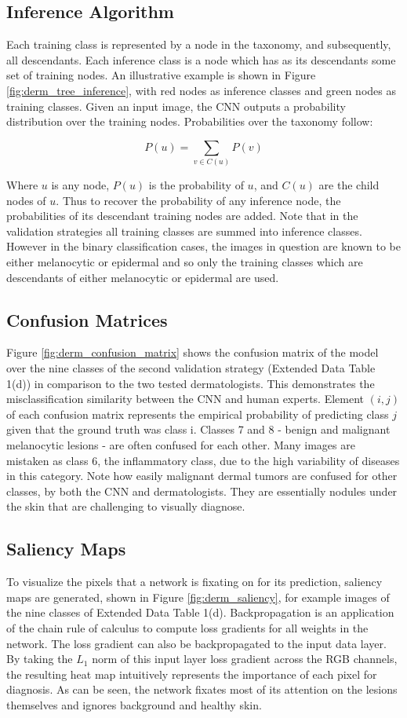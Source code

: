 \subsection{Inference Algorithm}
Each training class is represented by a node in the taxonomy, and subsequently, all descendants. Each inference class is a node which has as its descendants some set of training nodes. An illustrative example is shown in Figure \ref{fig:derm_tree_inference}, with red nodes as inference classes and green nodes as training classes. Given an input image, the CNN outputs a probability distribution over the training nodes. Probabilities over the taxonomy follow:

$$P(u) = \sum_{v \in C(u)}{P(v)}$$

Where $u$ is any node, $P(u)$ is the probability of $u$, and $C(u)$ are the child nodes of $u$. Thus to recover the probability of any inference node, the probabilities of its descendant training nodes are added. Note that in the validation strategies all training classes are summed into inference classes. However in the binary classification cases, the images in question are known to be either melanocytic or epidermal and so only the training classes which are descendants of either melanocytic or epidermal are used.

\subsection{Confusion Matrices}
Figure \ref{fig:derm_confusion_matrix} shows the confusion matrix of the model over the nine classes of the second validation strategy (Extended Data Table 1(d)) in comparison to the two tested dermatologists. This demonstrates the misclassification similarity between the CNN and human experts. Element $(i, j)$ of each confusion matrix represents the empirical probability of predicting class $j$ given that the ground truth was class i. Classes 7 and 8 - benign and malignant melanocytic lesions - are often confused for each other. Many images are mistaken as class 6, the inflammatory class, due to the high variability of diseases in this category. Note how easily malignant dermal tumors are confused for other classes, by both the CNN and dermatologists. They are essentially nodules under the skin that are challenging to visually diagnose. 

\subsection{Saliency Maps}
To visualize the pixels that a network is fixating on for its prediction, saliency maps are generated, shown in Figure \ref{fig:derm_saliency}, for example images of the nine classes of Extended Data Table 1(d). Backpropagation is an application of the chain rule of calculus to compute loss gradients for all weights in the network. The loss gradient can also be backpropagated to the input data layer. By taking the $L_1$ norm of this input layer loss gradient across the RGB channels, the resulting heat map intuitively represents the importance of each pixel for diagnosis. As can be seen, the network fixates most of its attention on the lesions themselves and ignores background and healthy skin.

